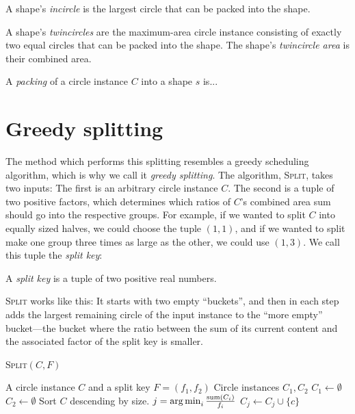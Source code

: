 \documentclass[a4paper,style=print,bibliography=totoc,nexus,lnum,extramargin]{tubsbook}
\begin{document}
\begin{definition}
    A shape's \emph{incircle} is the largest circle that can be packed into the shape.
\end{definition}

\begin{definition}
    A shape's \emph{twincircles} are the maximum-area circle instance consisting of exactly two equal circles that can be packed into the shape. The shape's \emph{twincircle area} is their combined area.
\end{definition}

\begin{definition}
    A \emph{packing} of a circle instance $C$ into a shape $s$ is...
\end{definition}

\section{Greedy splitting}

The method which performs this splitting resembles a greedy scheduling algorithm, which is why we call it \emph{greedy splitting}. The algorithm, \textsc{Split}, takes two inputs: The first is an arbitrary circle instance $C$. The second is a tuple of two positive factors, which determines which ratios of $C$'s combined area sum should go into the respective groups. For example, if we wanted to split $C$ into equally sized halves, we could choose the tuple $(1,1)$, and if we wanted to split make one group three times as large as the other, we could use $(1,3)$. We call this tuple the \emph{split key}:

\begin{definition}
    A \emph{split key} is a tuple of two positive real numbers.
\end{definition}

\textsc{Split} works like this: It starts with two empty “buckets”, and then in each step adds the largest remaining circle of the input instance to the “more empty” bucket---the bucket where the ratio between the sum of its current content and the associated factor of the split key is smaller.

\begin{algorithm}
    \caption{\textsc{Split}$(C,F)$}
    \begin{algorithmic}
        \Require A circle instance $C$ and a split key $F = (f_1, f_2)$
        \Ensure Circle instances $C_1, C_2$
        \State $C_1 \gets \emptyset$
        \State $C_2 \gets \emptyset$
        \State Sort $C$ descending by size.
            \State $j = \operatorname*{arg\,min}_{i} \frac{\operatorname{sum}(C_i)}{f_i}$
            \State $C_j \gets C_j \cup \{c\}$
        \EndFor
    \end{algorithmic}
\end{algorithm}
\end{document}
